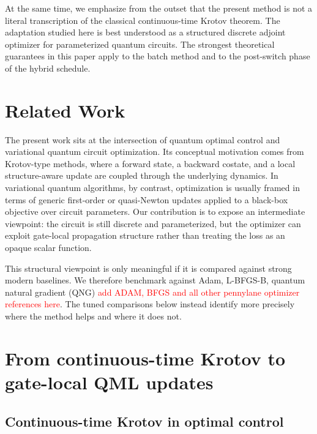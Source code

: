 \documentclass[aps,prb,10pt,twocolumn,superscriptaddress]{revtex4-2}
\begin{document}
At the same time, we emphasize from the outset that the present method is not a literal transcription of the classical continuous-time Krotov theorem. The adaptation studied here is best understood as a structured discrete adjoint optimizer for parameterized quantum circuits. The strongest theoretical guarantees in this paper apply to the batch method and to the post-switch phase of the hybrid schedule.

\section{Related Work}

The present work sits at the intersection of quantum optimal control and variational quantum circuit optimization. Its conceptual motivation comes from Krotov-type methods, where a forward state, a backward costate, and a local structure-aware update are coupled through the underlying dynamics. In variational quantum algorithms, by contrast, optimization is usually framed in terms of generic first-order or quasi-Newton updates applied to a black-box objective over circuit parameters. Our contribution is to expose an intermediate viewpoint: the circuit is still discrete and parameterized, but the optimizer can exploit gate-local propagation structure rather than treating the loss as an opaque scalar function.

This structural viewpoint is only meaningful if it is compared against strong modern baselines. We therefore benchmark against Adam, L-BFGS-B,  quantum natural gradient (QNG) \cite{StokesEtAl2020QNG} \textcolor{red}{add ADAM, BFGS and all other pennylane optimizer references here}. The tuned comparisons below instead identify more precisely where the method helps and where it does not.

\section{From continuous-time Krotov to gate-local QML updates}

\subsection{Continuous-time Krotov in optimal control}
\end{document}

